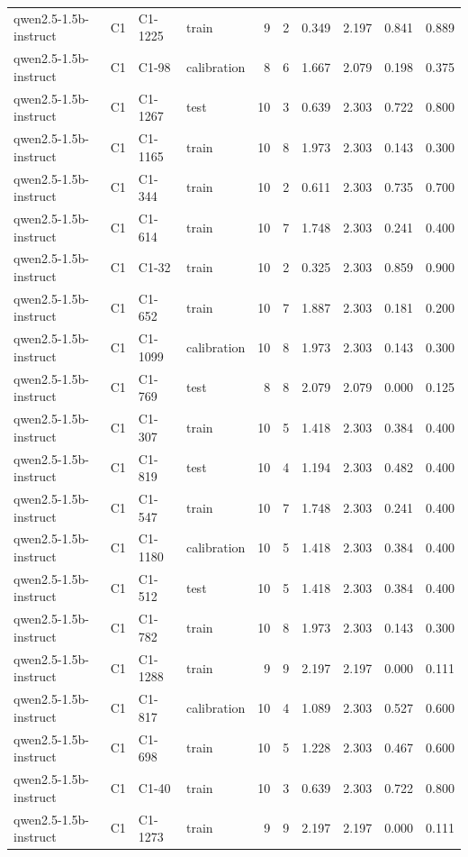 \begin{table}
\begin{tabular}{llllrrrrrr}
qwen2.5-1.5b-instruct & C1 & C1-1225 & train & 9 & 2 & 0.349 & 2.197 & 0.841 & 0.889 \\
qwen2.5-1.5b-instruct & C1 & C1-98 & calibration & 8 & 6 & 1.667 & 2.079 & 0.198 & 0.375 \\
qwen2.5-1.5b-instruct & C1 & C1-1267 & test & 10 & 3 & 0.639 & 2.303 & 0.722 & 0.800 \\
qwen2.5-1.5b-instruct & C1 & C1-1165 & train & 10 & 8 & 1.973 & 2.303 & 0.143 & 0.300 \\
qwen2.5-1.5b-instruct & C1 & C1-344 & train & 10 & 2 & 0.611 & 2.303 & 0.735 & 0.700 \\
qwen2.5-1.5b-instruct & C1 & C1-614 & train & 10 & 7 & 1.748 & 2.303 & 0.241 & 0.400 \\
qwen2.5-1.5b-instruct & C1 & C1-32 & train & 10 & 2 & 0.325 & 2.303 & 0.859 & 0.900 \\
qwen2.5-1.5b-instruct & C1 & C1-652 & train & 10 & 7 & 1.887 & 2.303 & 0.181 & 0.200 \\
qwen2.5-1.5b-instruct & C1 & C1-1099 & calibration & 10 & 8 & 1.973 & 2.303 & 0.143 & 0.300 \\
qwen2.5-1.5b-instruct & C1 & C1-769 & test & 8 & 8 & 2.079 & 2.079 & 0.000 & 0.125 \\
qwen2.5-1.5b-instruct & C1 & C1-307 & train & 10 & 5 & 1.418 & 2.303 & 0.384 & 0.400 \\
qwen2.5-1.5b-instruct & C1 & C1-819 & test & 10 & 4 & 1.194 & 2.303 & 0.482 & 0.400 \\
qwen2.5-1.5b-instruct & C1 & C1-547 & train & 10 & 7 & 1.748 & 2.303 & 0.241 & 0.400 \\
qwen2.5-1.5b-instruct & C1 & C1-1180 & calibration & 10 & 5 & 1.418 & 2.303 & 0.384 & 0.400 \\
qwen2.5-1.5b-instruct & C1 & C1-512 & test & 10 & 5 & 1.418 & 2.303 & 0.384 & 0.400 \\
qwen2.5-1.5b-instruct & C1 & C1-782 & train & 10 & 8 & 1.973 & 2.303 & 0.143 & 0.300 \\
qwen2.5-1.5b-instruct & C1 & C1-1288 & train & 9 & 9 & 2.197 & 2.197 & 0.000 & 0.111 \\
qwen2.5-1.5b-instruct & C1 & C1-817 & calibration & 10 & 4 & 1.089 & 2.303 & 0.527 & 0.600 \\
qwen2.5-1.5b-instruct & C1 & C1-698 & train & 10 & 5 & 1.228 & 2.303 & 0.467 & 0.600 \\
qwen2.5-1.5b-instruct & C1 & C1-40 & train & 10 & 3 & 0.639 & 2.303 & 0.722 & 0.800 \\
qwen2.5-1.5b-instruct & C1 & C1-1273 & train & 9 & 9 & 2.197 & 2.197 & 0.000 & 0.111 \\

\end{tabular}
\end{table}
